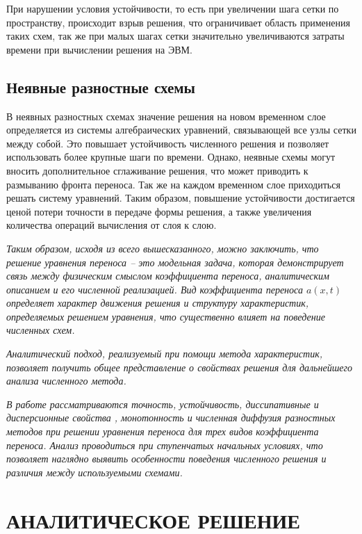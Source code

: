 \documentclass[a4paper,14pt]{extreport}
\begin{document}
При нарушении условия устойчивости, то есть при увеличении шага сетки по пространству, происходит взрыв решения, что ограничивает область применения таких схем, так же при малых шагах сетки значительно увеличиваются затраты времени при вычислении решения на ЭВМ.

\section*{Неявные разностные схемы}

В неявных разностных схемах \cite{bakhvalov, popov, hakimzyanov} значение решения на новом временном слое определяется из системы алгебраических уравнений, связывающей все узлы сетки между собой. Это повышает устойчивость численного решения и позволяет использовать более крупные шаги по времени. Однако, неявные схемы могут вносить дополнительное сглаживание решения, что может приводить к размыванию фронта переноса. Так же на каждом временном слое приходиться решать систему уравнений. Таким образом, повышение устойчивости достигается ценой потери точности в передаче формы решения, а также увеличения количества операций вычисления от слоя к слою.

\textit{Таким образом, исходя из всего вышесказанного, можно заключить, что решение уравнения переноса – это модельная задача, которая демонстрирует связь между физическим смыслом коэффициента переноса, аналитическим описанием и его численной реализацией. Вид коэффициента переноса $a(x, t)$ определяет характер движения решения и структуру характеристик, определяемых решением уравнения, что существенно влияет на поведение численных схем.}

\textit{Аналитический подход, реализуемый при помощи метода характеристик, позволяет получить общее представление о свойствах решения для дальнейшего анализа численного метода.}

\textit{В работе рассматриваются точность, устойчивость, диссипативные и дисперсионные свойства \cite{goloviznin}, монотонность и численная диффузия разностных методов при решении уравнения переноса для трех видов коэффициента переноса. Анализ проводиться при ступенчатых начальных условиях, что позволяет наглядно выявить особенности поведения численного решения и различия между используемыми схемами.}\\

\chapter{АНАЛИТИЧЕСКОЕ РЕШЕНИЕ}
\end{document}
